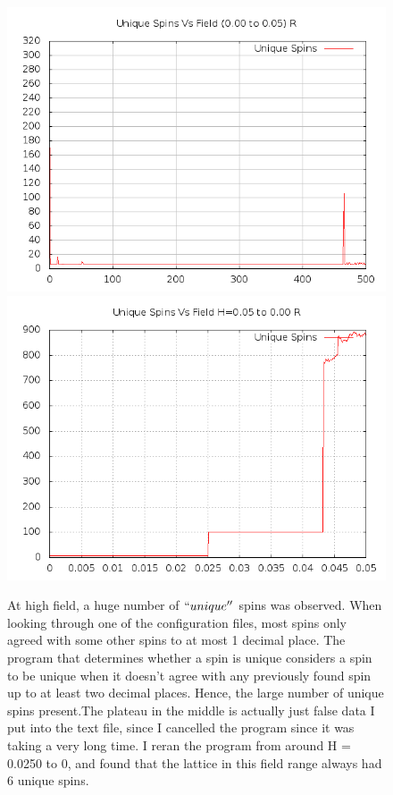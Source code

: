 \documentclass{article}
\begin{document}
\begin{figure}[ht]
\centering
\includegraphics[scale=0.5]{100/000to005RFreq.png}
\includegraphics[scale=0.5]{100/005to000RFreq.png}
\caption{At high field, a huge number of $``unique''$ spins was observed. When looking through one of the configuration
files, most spins only agreed with some other spins to at most 1 decimal place. The program that determines whether
a spin is unique considers a spin to be unique when it doesn't agree with any previously found spin up to at least two decimal 
places. Hence, the large number of unique spins present.The plateau in the middle is actually just false data I put
into the text file, since I cancelled the program since it was taking a very long time. I reran the program from around
H = 0.0250 to 0, and found that the lattice in this field range always had 6 unique spins.}
\end{figure}
\clearpage
\end{document}
